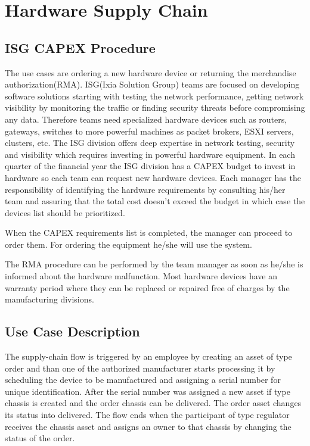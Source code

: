 \chapter{Hardware Supply Chain}
\label{chapter:chapter4}

\section{ISG CAPEX Procedure}
\label{sub-sec:chapter4-section1}
The \emph{\project} use cases are ordering a new hardware device or returning the merchandise authorization(RMA).
ISG(Ixia Solution Group) teams are focused on developing software solutions starting with testing the network performance, getting network visibility by monitoring the traffic or finding security threats before compromising any data.
Therefore teams need specialized hardware devices such as routers, gateways, switches to more powerful machines as packet brokers, ESXI servers, clusters, etc.
The ISG division offers deep expertise in network testing, security and visibility which requires investing in powerful hardware equipment.
In each quarter of the financial year the ISG division has a CAPEX budget to invest in hardware so each team can request new hardware devices.
Each manager has the responsibility of identifying the hardware requirements by consulting his/her team and assuring that the total cost doesn't exceed the budget in which case the devices list should be prioritized.

When the CAPEX requirements list is completed, the manager can proceed to order them.
For ordering the equipment he/she will use the \emph{\project} system.

The RMA procedure can be performed by the team manager as soon as he/she is informed about the hardware malfunction. Most hardware devices have an warranty period where they can be replaced or repaired free of charges by the manufacturing divisions. 

\section{Use Case Description}
\label{sub-sec:chapter4-section1}
The supply-chain flow is triggered by an employee by creating an asset of type order and than one of the authorized manufacturer starts processing it by scheduling the device to be manufactured and assigning a serial number for unique identification. After the serial number was assigned a new asset if type chassis is created and the order chassis can be delivered. The order asset changes its status into delivered.
The flow ends when the participant of type regulator receives the chassis asset and assigns an owner to that chassis by changing the status of the order. 



